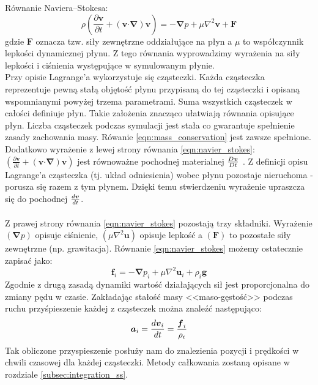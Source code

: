 {\sc Równanie Naviera--Stokesa:}
\begin{equation}
\rho \left( \frac{\partial \boldsymbol{v}}{\partial t} + \left( \boldsymbol{v} \boldsymbol{\cdot} \boldsymbol{\nabla} \right) \boldsymbol{v} \right) = -\boldsymbol{\nabla} p + \mu \nabla^{2} \boldsymbol{v} + \boldsymbol{F}
\label{eqn:navier_stokes}
\end{equation}
gdzie $\boldsymbol{F}$ oznacza tzw. siły zewnętrzne oddziałujące na płyn a $\mu$ to współczynnik lepkości dynamicznej płynu. Z tego równania wyprowadzimy wyrażenia na siły lepkości i ciśnienia występujące w symulowanym płynie.\\
Przy opisie Lagrange'a wykorzystuje się cząsteczki. Każda cząsteczka reprezentuje pewną stałą objętość płynu przypisaną do tej cząsteczki i opisaną wspomnianymi powyżej trzema parametrami. Suma wszystkich cząsteczek w całości definiuje płyn. Takie założenia znacząco ułatwiają równania opisujące płyn. Liczba cząsteczek podczas symulacji jest stała co gwarantuje spełnienie zasady zachowania masy. Rówanie \eqref{eqn:mass_conservation} jest zawsze spełnione. Dodatkowo wyrażenie z lewej strony równania \eqref{eqn:navier_stokes}: $\left( \frac{\partial \boldsymbol{v}}{\partial t} + \left( \boldsymbol{v} \boldsymbol{\cdot} \boldsymbol{\nabla} \right) \boldsymbol{v} \right)$ jest równoważne pochodnej materialnej ${D\boldsymbol{v} \over Dt}$ \cite{wiki:1}. Z definicji opisu Lagrange'a cząsteczka (tj. układ odniesienia) wobec płynu pozostaje nieruchoma - porusza się razem z tym płynem. Dzięki temu stwierdzeniu wyrażenie upraszcza się do pochodnej ${d\boldsymbol{v} \over dt}$.
\par

\paragraph{}
Z prawej strony równania \eqref{eqn:navier_stokes} pozostają trzy składniki. Wyrażenie $\left( \boldsymbol{\nabla} p \right)$ opisuje ciśnienie, $\left( \mu \nabla^{2} \boldsymbol{u} \right)$ opisuje lepkość a $\left( \boldsymbol{F} \right)$ to pozostałe siły zewnętrzne (np. grawitacja). Równanie \eqref{eqn:navier_stokes} możemy ostatecznie zapisać jako:
\begin{equation}
\boldsymbol{f}_i = -\boldsymbol{\nabla} p_i + \mu \nabla^{2} \boldsymbol{u}_i + \rho_i \boldsymbol{g}
\label{eqn:navier_stokes_lagrangian}
\end{equation}
Zgodnie z drugą zasadą dynamiki wartość działających sił jest proporcjonalna do zmiany pędu w czasie. Zakładając stałość masy <<maso-gęstość>> podczas ruchu przyśpieszenie każdej z cząsteczek można znaleźć następująco:
\begin{equation}
\boldsymbol{a}_i = {d\boldsymbol{v}_i \over dt} = {\boldsymbol{f}_i \over \rho_i}
\label{eqn:acc}
\end{equation}
Tak obliczone przyspieszenie posłuży nam do znalezienia pozycji i prędkości w chwili czasowej dla każdej cząsteczki. Metody całkowania zostaną opisane w rozdziale \eqref{subsec:integration_ss}.
\par

